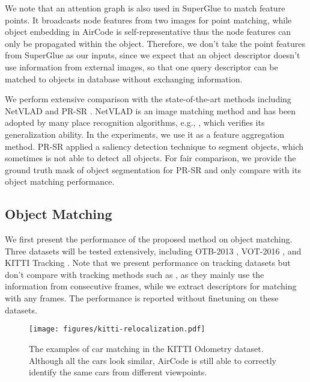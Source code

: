 \documentclass[letterpaper, 10 pt, journal, twoside]{IEEEtran}  %
\begin{document}
We note that an attention graph is also used in SuperGlue \cite{sarlin2020superglue} to match feature points.
It broadcasts node features from two images for point matching, while object embedding in AirCode is self-representative thus the node features can only be propagated within the object.
Therefore, we don't take the point features from SuperGlue as our inputs, since we expect that an object descriptor doesn't use information from external images, so that one query descriptor can be matched to objects in database without exchanging information. 

We perform extensive comparison with the state-of-the-art methods including NetVLAD \cite{arandjelovic2016netvlad} and PR-SR \cite{wang2020online}.
NetVLAD is an image matching method and has been adopted by many place recognition algorithms, e.g., \cite{sarlin2019coarse,liu2019lpd}, which verifies its generalization ability. In the experiments, we use it as a feature aggregation method.
PR-SR applied a saliency detection technique to segment objects, which sometimes is not able to detect all objects.
For fair comparison, we provide the ground truth mask of object segmentation for PR-SR and only compare with its object matching performance.

\subsection{Object Matching}\label{sec:matching}


We first present the performance of the proposed method on object matching. Three datasets will be tested extensively, including OTB-2013 \cite{wu2013online}, VOT-2016 \cite{VOT_TPAMI}, and KITTI Tracking \cite{luiten2021hota}.
Note that we present performance on tracking datasets but don't compare with tracking methods such as \cite{wang2018kernel}, as they mainly use the information from consecutive frames, while we extract descriptors for matching with any frames.
The performance is reported without finetuning on these datasets.

\begin{figure*}[t]
    \centering
    \texttt{[image: figures/kitti-relocalization.pdf]}
    \caption{The examples of car matching in the KITTI Odometry dataset. Although all the cars look similar, AirCode is still able to correctly identify the same cars from different viewpoints.}
    \label{fig:kitti-relocalization}
\end{figure*}
\end{document}
